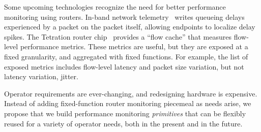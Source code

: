Some upcoming technologies recognize the need for better performance monitoring
using routers. In-band network telemetry~\cite{int} writes queueing delays
experienced by a packet on the packet itself, allowing endpoints to localize
delay spikes. The Tetration router chip~\cite{tetration-telemetry} provides a
``flow cache'' that measures flow-level performance metrics.
%
These metrics are useful, but they are exposed at a fixed granularity, and
aggregated with fixed functions. For example, the list of exposed metrics
includes flow-level latency and packet size variation, but not latency
variation, \ie jitter.

Operator requirements are ever-changing, and redesigning hardware is expensive.
Instead of adding fixed-function router monitoring piecemeal as needs arise,
we propose that we build performance monitoring {\em
primitives} that can be flexibly reused for a variety of operator needs, both
in the present and in the future.


